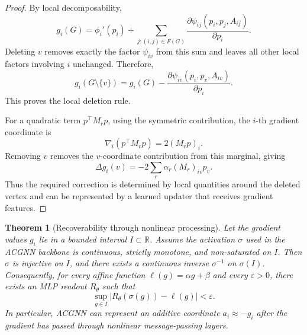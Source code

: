 \documentclass[11pt]{article}
\theoremstyle{plain}
\newtheorem{theorem}{Theorem}[section]
\theoremstyle{definition}
\theoremstyle{remark}
\begin{document}
\begin{proof}
  By local decomposability,
  \[
    g_i(G)
    =
    \phi_i'(p_i)
    +
    \sum_{j:(i,j)\in F(G)}
    \frac{\partial \psi_{ij}(p_i,p_j,A_{ij})}{\partial p_i}.
  \]
  Deleting \(v\) removes exactly the factor \(\psi_{iv}\) from this sum and leaves all
  other local factors involving \(i\) unchanged. Therefore,
  \[
    g_i(G\setminus \{v\})
    =
    g_i(G)
    -
    \frac{\partial \psi_{iv}(p_i,p_v,A_{iv})}{\partial p_i}.
  \]
  This proves the local deletion rule.

  For a quadratic term \(p^\top M_r p\), using the symmetric contribution, the
  \(i\)-th gradient coordinate is
  \[
    \nabla_i(p^\top M_r p)=2(M_rp)_i.
  \]
  Removing \(v\) removes the \(v\)-coordinate contribution from this marginal, giving
  \[
    \Delta g_i(v)
    =
    -2\sum_r \alpha_r (M_r)_{iv}p_v .
  \]
  Thus the required correction is determined by local quantities around the deleted
  vertex and can be represented by a learned updater that receives gradient features.
\end{proof}

\begin{theorem}[Recoverability through nonlinear processing]
  \label{thm:acgnn_positive}
  Let the gradient values \(g_i\) lie in a bounded interval \(I\subset\mathbb{R}\).
  Assume the activation \(\sigma\) used in the ACGNN backbone is continuous, strictly
  monotone, and non-saturated on \(I\). Then \(\sigma\) is injective on \(I\), and
  there exists a continuous inverse \(\sigma^{-1}\) on \(\sigma(I)\). Consequently,
  for every affine function \(\ell(g)=\alpha g+\beta\) and every \(\varepsilon>0\),
  there exists an MLP readout \(R_\theta\) such that
  \[
    \sup_{g\in I}
    \left|
    R_\theta(\sigma(g))-\ell(g)
    \right|
    <\varepsilon .
  \]
  In particular, ACGNN can represent an additive coordinate \(a_i\approx -g_i\) after
  the gradient has passed through nonlinear message-passing layers.
\end{theorem}
\end{document}
